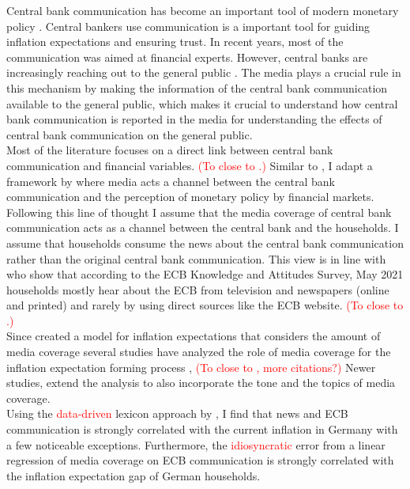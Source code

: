 \documentclass[review]{elsarticle}
\begin{document}
Central bank communication has become an important tool of modern monetary policy \citep{Blinderetal2017}. Central bankers use communication is a important tool for guiding inflation expectations and ensuring trust. In recent years, most of the communication was aimed at financial experts. However, central banks are increasingly reaching out to the general public \citep{Blinderetal2022}. The media plays a crucial rule in this mechanism by making the information of the central bank communication available to the general public, which makes it crucial to understand how central bank communication is reported in the media for understanding the effects of central bank communication on the general public.
\\
Most of the literature focuses on a direct link between central bank communication and financial variables. \textcolor{red}{(To close to \cite{Picaultetal2022}.)} Similar to \cite{Picaultetal2022}, I adapt a framework by \cite{HayoNeuenkirch2015} where media acts a channel between the central bank communication and the perception of monetary policy by financial markets. 
Following this line of thought I assume that the media coverage of central bank communication acts as a channel between the central bank and the households. I assume that households consume the news about the central bank communication rather than the original central bank communication. This view is in line with \cite{Gardt2022} who show that according to the ECB Knowledge and Attitudes Survey, May 2021 households mostly hear about the ECB from television and newspapers (online and printed) and rarely by using direct sources like the ECB website. \textcolor{red}{(To close to \cite{Blinderetal2022}.)}
\\
Since \cite{Carroll2003} created a model for inflation expectations that considers the amount of media coverage several studies have analyzed the role of media coverage for the inflation expectation forming process \cite{Ehrmann2017},  \textcolor{red}{(To close to \cite{Larsen2021}, more citations?)}
Newer studies, extend the analysis to also incorporate the tone \citep{LamlaLein2014} and the topics \citep{Larsen2021} of media coverage. 
\\
Using the \textcolor{red}{data-driven} lexicon approach by \cite{PicaultRenault2017}, I find that news and ECB communication is strongly correlated with the current inflation in Germany with a few noticeable exceptions. Furthermore, the \textcolor{red}{idiosyncratic} error from a linear regression of media coverage on ECB communication is strongly correlated with the inflation expectation gap of German households.
\end{document}
